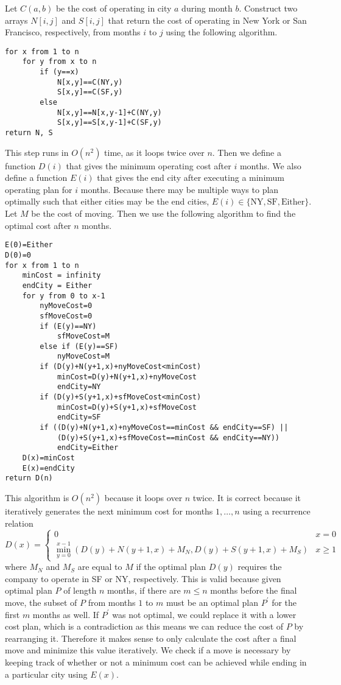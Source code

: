 \documentclass[12pt]{article}
\begin{document}
Let \(C(a,b)\) be the cost of operating in city \(a\) during month \(b\). Construct two arrays \(N[i,j]\) and \(S[i,j]\)
that return the cost of operating in New York or San Francisco, respectively, from months \(i\) to \(j\) using the following algorithm.
\begin{verbatim}
for x from 1 to n
    for y from x to n
        if (y==x)
            N[x,y]==C(NY,y)
            S[x,y]==C(SF,y)
        else
            N[x,y]==N[x,y-1]+C(NY,y)
            S[x,y]==S[x,y-1]+C(SF,y)
return N, S
\end{verbatim}
This step runs in \(O(n^2)\) time, as it loops twice over \(n\). Then we define a function \(D(i)\) that gives the minimum operating cost
after \(i\) months. We also define a function \(E(i)\) that gives the end city after executing a minimum operating plan for \(i\) months.
Because there may be multiple ways to plan optimally such that either cities may be the end cities,
\(E(i)\in\{\text{NY},\text{SF},\text{Either}\}\). Let \(M\) be the cost of moving. Then we use the following algorithm to find the
optimal cost after \(n\) months.
\begin{verbatim}
E(0)=Either
D(0)=0
for x from 1 to n
    minCost = infinity
    endCity = Either
    for y from 0 to x-1
        nyMoveCost=0
        sfMoveCost=0
        if (E(y)==NY)
            sfMoveCost=M
        else if (E(y)==SF)
            nyMoveCost=M
        if (D(y)+N(y+1,x)+nyMoveCost<minCost)
            minCost=D(y)+N(y+1,x)+nyMoveCost
            endCity=NY
        if (D(y)+S(y+1,x)+sfMoveCost<minCost)
            minCost=D(y)+S(y+1,x)+sfMoveCost
            endCity=SF
        if ((D(y)+N(y+1,x)+nyMoveCost==minCost && endCity==SF) ||
            (D(y)+S(y+1,x)+sfMoveCost==minCost && endCity==NY))
            endCity=Either
    D(x)=minCost
    E(x)=endCity
return D(n)
\end{verbatim}
This algorithm is \(O(n^2)\) because it loops over \(n\) twice. It is correct because it iteratively generates the next minimum cost for months \(1,\ldots,n\)
using a recurrence relation
\[D(x)=\begin{cases} 0 & x=0\\ \min\limits_{y=0}^{x-1} (D(y)+N(y+1,x)+M_N,D(y)+S(y+1,x)+M_S) & x\geq1 \end{cases}\]
where \(M_N\) and \(M_S\) are equal to \(M\) if the optimal plan \(D(y)\) requires the company to operate in SF or NY, respectively. This is valid because given
optimal plan \(P\) of length \(n\) months, if there are \(m\leq n\) months before the final move, the subset of \(P\) from months \(1\) to \(m\) must be an
optimal plan \(P^\prime\) for the first \(m\) months as well. If \(P^\prime\) was not optimal, we could replace it with a lower cost plan, which is a contradiction
as this means we can reduce the cost of \(P\) by rearranging it. Therefore it makes sense to only calculate the cost after a final move and minimize this value iteratively.
We check if a move is necessary by keeping track of whether or not a minimum cost can be achieved while ending in a particular city using \(E(x)\).
\end{document}
